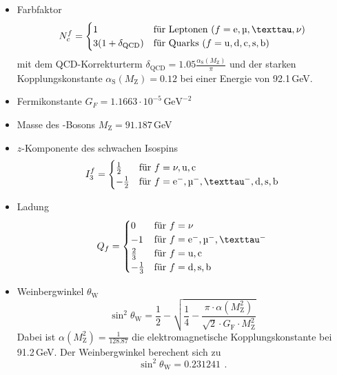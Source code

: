 \begin{itemize}
    \item Farbfaktor
    \begin{equation}
        N_c^f =
        \begin{cases}
            1 & \text{für Leptonen } (f = \text{e}, \text{\textmu}, \text{\texttau}, \nu) \\
            3 (1 + \delta_\text{QCD}) & \text{für Quarks } (f = \text{u,\,d,\,c,\,s,\,b})
        \end{cases}
    \end{equation}
    mit dem QCD-Korrekturterm $\delta_\text{QCD} = 1.05 \frac{\alpha_\text{S}(M_\text{Z})}{\pi}$ und der starken Kopplungskonstante
    $\alpha_\text{S}(M_\text{Z}) = 0.12$ bei einer Energie von 92.1\,GeV.
    \item Fermikonstante $G_F = 1.1663 \cdot 10^{-5}\,\text{GeV}^{-2}$ \cite{manual}
    \item Masse des \Z-Bosons $M_\text{Z}=91.187$\,GeV
    \item $z$-Komponente des schwachen Isospins
    \begin{equation}
        I_3^f =
        \begin{cases}
            \frac{1}{2}  & \text{für } f = \nu, \text{u,\,c} \\
            -\frac{1}{2} & \text{für } f = \text{\elm,\,\textmu$^-$,\,\texttau$^-$,\,d,\,s,\,b}
        \end{cases}
    \end{equation}
    \item Ladung
    \begin{equation}
        Q_f =
        \begin{cases}
            0			& \text{für } f = \nu \\
         -1			& \text{für } f = \text{\elm,\,\textmu$^-$,\,\texttau$^-$} \\
      \frac{2}{3}	& \text{für } f = \text{u,\,c} \\
     -\frac{1}{3}& \text{für } f = \text{d,\,s,\,b}
        \end{cases}
    \end{equation}
    \item Weinbergwinkel $\theta_\text{W}$
    \begin{equation}
        \sin^2 \theta_\text{W} = \frac{1}{2} - \sqrt{\frac{1}{4} - \frac{\pi \cdot \alpha \left( M_\text{Z}^2 \right) }{\sqrt{2} \cdot G_\text{F} \cdot M_\text{Z}^2}}
    \end{equation}
    Dabei ist $\alpha \left( M_\text{Z}^2 \right) = \frac{1}{128.87}$ die elektromagnetische Kopplungskonstante bei 91.2\,GeV. Der Weinbergwinkel
    berechent sich zu
    \begin{equation}
        \sin^2 \theta_\text{W} = 0.231241 \ \, .
    \end{equation}
\end{itemize}
